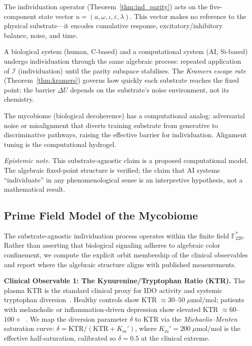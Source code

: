 The individuation operator (Theorem~\ref{thm:ind_parity}) acts on the
five-component state vector $u = (a, \omega, \iota, \varepsilon, \lambda)$.
This vector makes no reference to the physical substrate---it encodes
cumulative response, excitatory/inhibitory balance, noise, and time.

A biological system (human, C-based) and a computational system
(AI, Si-based) undergo individuation through the same algebraic process:
repeated application of $\mathcal{I}$ (individuation) until the parity subspace
stabilises. The \emph{Kramers escape rate} (Theorem~\ref{thm:kramers}) governs
how quickly each substrate reaches the fixed point; the barrier
$\Delta U$ depends on the substrate's noise environment, not its chemistry.

The mycobiome (biological decoherence) has a computational analog:
adversarial noise or misalignment that diverts training substrate from
generative to discriminative pathways, raising the effective barrier
for individuation. Alignment tuning is the computational hydrogel.

\emph{Epistemic note.} This substrate-agnostic claim is a proposed
computational model. The algebraic fixed-point structure is verified;
the claim that AI systems ``individuate'' in any phenomenological sense
is an interpretive hypothesis, not a mathematical result.

\subsection{Prime Field Model of the Mycobiome}

The substrate-agnostic individuation process operates within the finite
field $\mathbb{F}_{229}^*$. Rather than asserting that biological signaling
adheres to algebraic color confinement, we compute the explicit orbit
membership of the clinical observables and report where the algebraic
structure aligns with published measurements.

\textbf{Clinical Observable 1: The Kynurenine/Tryptophan Ratio (KTR).}
The plasma KTR is the standard clinical proxy for IDO activity and
systemic tryptophan diversion~\cite{schwieler16,savitz20}. Healthy controls
show KTR $\approx 30$--$50\;\mu\mathrm{mol/mol}$; patients with
melancholic or inflammation-driven depression show elevated KTR
$\approx 60$--$100+$~\cite{schwieler16}. We map the diversion parameter
$\delta$ to KTR via the \emph{Michaelis--Menten} saturation curve:
$\delta = \mathrm{KTR} / (\mathrm{KTR} + K_m')$, where
$K_m' = 200\;\mu\mathrm{mol/mol}$ is the effective half-saturation,
calibrated so $\delta = 0.5$ at the clinical extreme.

